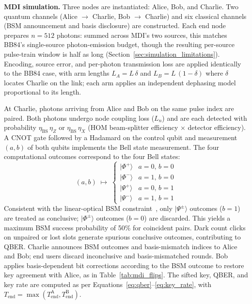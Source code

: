 \documentclass[12pt]{article}
\begin{document}
\textbf{MDI simulation.} Three nodes are instantiated: Alice, Bob, and Charlie. Two quantum channels (Alice $\to$ Charlie, Bob $\to$ Charlie) and six classical channels (BSM announcement and basis disclosure) are constructed. Each end node prepares $n = 512$ photons: summed across MDI's two sources, this matches BB84's single-source photon-emission budget, though the resulting per-source pulse-train window is half as long (Section~\ref{sec:simulation_limitations}). Encoding, source error, and per-photon transmission loss are applied identically to the BB84 case, with arm lengths $L_A = L\,\delta$ and $L_B = L\,(1-\delta)$ where $\delta$ locates Charlie on the link; each arm applies an independent dephasing model proportional to its length.

At Charlie, photons arriving from Alice and Bob on the same pulse index are paired. Both photons undergo node coupling loss ($L_n$) and are each detected with probability $\eta_\text{BS}\,\eta_Z$ or $\eta_\text{BS}\,\eta_X$ (HOM beam-splitter efficiency × detector efficiency). A CNOT gate followed by a Hadamard on the control qubit and measurement $(a,b)$ of both qubits implements the Bell state measurement. The four computational outcomes correspond to the four Bell states:
\begin{equation}
    (a,b) \;\longmapsto\;
    \begin{cases}
        |\Phi^+\rangle & a=0,\,b=0 \\
        |\Phi^-\rangle & a=1,\,b=0 \\
        |\Psi^+\rangle & a=0,\,b=1 \\
        |\Psi^-\rangle & a=1,\,b=1
    \end{cases}
\end{equation}
Consistent with the linear-optical BSM constraint~\cite{Lo_2012}, only $|\Psi^\pm\rangle$ outcomes ($b=1$) are treated as conclusive; $|\Phi^\pm\rangle$ outcomes ($b=0$) are discarded. This yields a maximum BSM success probability of 50\% for coincident pairs. Dark count clicks on unpaired or lost slots generate spurious conclusive outcomes, contributing to QBER. Charlie announces BSM outcomes and basis-mismatch indices to Alice and Bob; end users discard inconclusive and basis-mismatched rounds. Bob applies basis-dependent bit corrections according to the BSM outcome to restore key agreement with Alice, as in Table~\ref{tab:mdi_flips}. The sifted key, QBER, and key rate are computed as per Equations~\ref{eq:qber}--\ref{eq:key_rate}, with $T_\text{end} = \max(T^\text{A}_\text{end}, T^\text{B}_\text{end})$.
\end{document}

